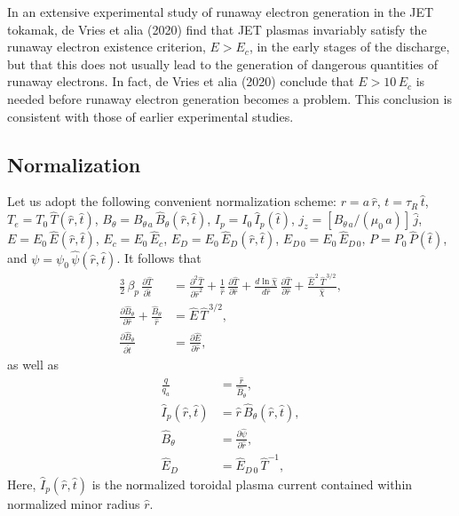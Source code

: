 \documentclass[12pt,prb,aps]{revtex4-1}
\begin{document}
 In an extensive experimental study of runaway electron generation in the JET tokamak,\cite{run} de Vries et alia (2020) find that JET
  plasmas invariably satisfy the runaway electron existence criterion, $E>E_c$, in the early stages of the discharge, but that this does not
 usually lead to the generation of dangerous quantities of runaway electrons. In fact, de Vries et alia (2020) conclude that $E>10\,E_c$ is
 needed before runaway electron generation becomes a problem. This conclusion is consistent with those of earlier experimental 
 studies.\cite{granetz,paz,pop}
 
\subsection{Normalization}
 Let us adopt the following convenient normalization scheme: $r=a\,\hat{r}$, $t=\tau_R\,\hat{t}$, $T_e=T_0\,\hat{T}(\hat{r},\hat{t})$, $B_\theta=B_{\theta\,a}\,\hat{B}_\theta(\hat{r},\hat{t})$,
 $I_p=I_0\,\hat{I}_p(\hat{t})$, $j_z=[B_{\theta\,a}/(\mu_0\,a)]\,\hat{j}$, $E=E_0\,\hat{E}(\hat{r},\hat{t})$, $E_c= E_0\,\hat{E}_c$, $E_D= E_0\,\hat{E}_D(\hat{r},\hat{t})$, $E_{D\,0}=E_0\,\hat{E}_{D\,0}$, $P= P_0\,\hat{P}(\hat{t})$,  and
 $\psi=\psi_0\,\hat{\psi}(\hat{r},\hat{t})$. It follows that 
 \begin{align}\label{e25}
\frac{3}{2}\,\beta_p\,\frac{\partial \hat{T}}{\partial\hat{t}}&=
 \frac{\partial^2\hat{T}}{\partial \hat{r}^2} 
 +\frac{1}{\hat{r}}\,\frac{\partial\hat{T}}{\partial\hat{r}} + \frac{d\ln\hat{\chi}}{d\hat{r}}\,\frac{\partial\hat{T}}{\partial\hat{r}}
 + \frac{\hat{E}^{\,2}\,\hat{T}^{\,3/2}}{\hat{\chi}},\\[0.5ex]
\frac{\partial\hat{B}_\theta}{\partial \hat{r}} + \frac{\hat{B}_\theta}{\hat{r}}&= \hat{E}\,\hat{T}^{\,3/2},\\[0.5ex]
\frac{\partial\hat{B}_\theta}{\partial\hat{t}}&= \frac{\partial\hat{E}}{\partial\hat{r}},\label{e27}
 \end{align}
 as well as
 \begin{align}
 \frac{q}{q_a}&= \frac{\hat{r}}{\hat{B}_\theta},\label{e28}\\[0.5ex]
 \hat{I}_p(\hat{r},\hat{t})&= \hat{r}\,\hat{B}_\theta(\hat{r},\hat{t}),\label{e29}\\[0.5ex]
 \hat{B}_\theta &=\frac{\partial\hat{\psi}}{\partial\hat{r}},\label{e30}\\[0.5ex]
 \hat{E}_D&= \hat{E}_{D\,0}\,\hat{T}^{-1},
 \end{align}
 Here, $\hat{I}_p(\hat{r},\hat{t})$ is the normalized toroidal plasma current contained within normalized minor radius $\hat{r}$. 
\end{document}
